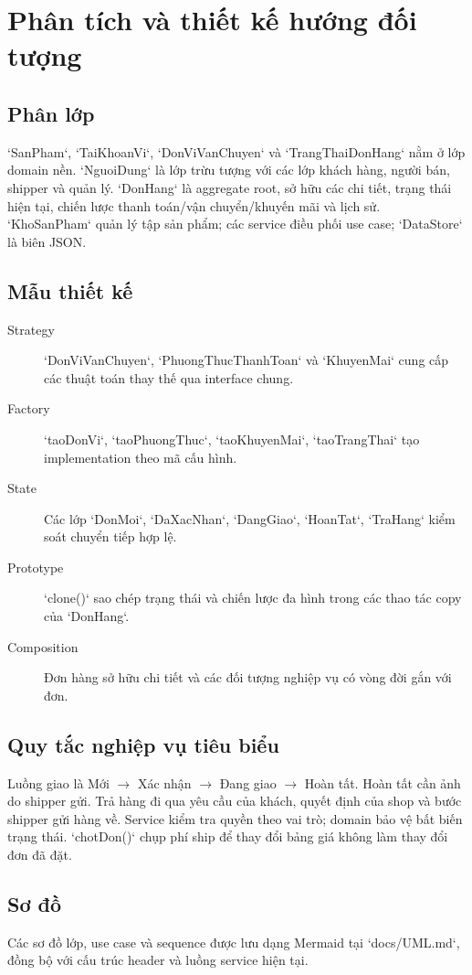 \chapter{Phân tích và thiết kế hướng đối tượng}
\section{Phân lớp}
`SanPham`, `TaiKhoanVi`, `DonViVanChuyen` và `TrangThaiDonHang` nằm ở lớp domain nền. `NguoiDung` là lớp trừu tượng với các lớp khách hàng, người bán, shipper và quản lý. `DonHang` là aggregate root, sở hữu các chi tiết, trạng thái hiện tại, chiến lược thanh toán/vận chuyển/khuyến mãi và lịch sử. `KhoSanPham` quản lý tập sản phẩm; các service điều phối use case; `DataStore` là biên JSON.

\section{Mẫu thiết kế}
\begin{description}
  \item[Strategy] `DonViVanChuyen`, `PhuongThucThanhToan` và `KhuyenMai` cung cấp các thuật toán thay thế qua interface chung.
  \item[Factory] `taoDonVi`, `taoPhuongThuc`, `taoKhuyenMai`, `taoTrangThai` tạo implementation theo mã cấu hình.
  \item[State] Các lớp `DonMoi`, `DaXacNhan`, `DangGiao`, `HoanTat`, `TraHang` kiểm soát chuyển tiếp hợp lệ.
  \item[Prototype] `clone()` sao chép trạng thái và chiến lược đa hình trong các thao tác copy của `DonHang`.
  \item[Composition] Đơn hàng sở hữu chi tiết và các đối tượng nghiệp vụ có vòng đời gắn với đơn.
\end{description}

\section{Quy tắc nghiệp vụ tiêu biểu}
Luồng giao là Mới $\rightarrow$ Xác nhận $\rightarrow$ Đang giao $\rightarrow$ Hoàn tất. Hoàn tất cần ảnh do shipper gửi. Trả hàng đi qua yêu cầu của khách, quyết định của shop và bước shipper gửi hàng về. Service kiểm tra quyền theo vai trò; domain bảo vệ bất biến trạng thái. `chotDon()` chụp phí ship để thay đổi bảng giá không làm thay đổi đơn đã đặt.

\section{Sơ đồ}
Các sơ đồ lớp, use case và sequence được lưu dạng Mermaid tại `docs/UML.md`, đồng bộ với cấu trúc header và luồng service hiện tại.
